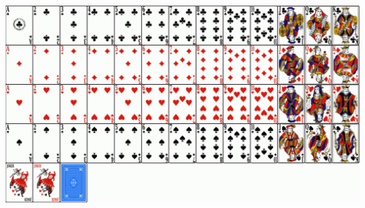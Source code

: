 \documentclass[12pt,twoside]{article}
\begin{document}
\includegraphics[width=\textwidth, angle=0]{kaartspel}


\end{document}
